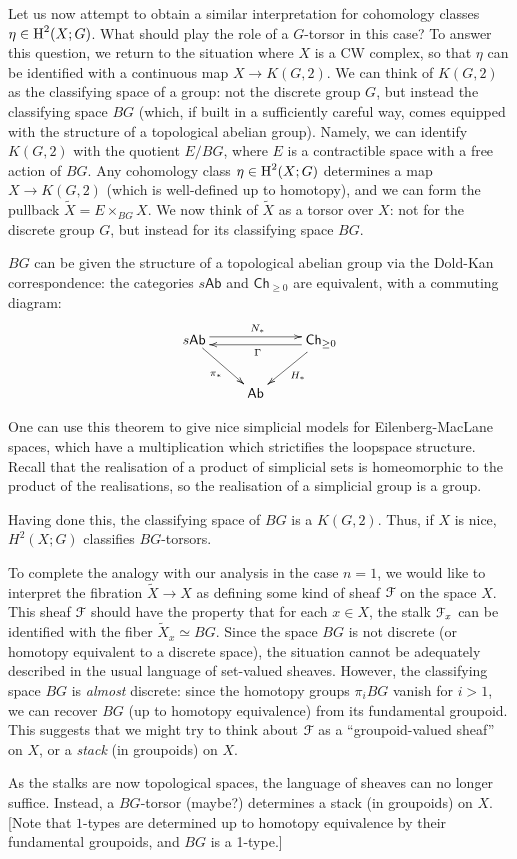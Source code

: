 Let us now attempt to obtain a similar interpretation for cohomology classes $\eta \in \operatorname{H}^{2}(X;G)$. 
What should play the role of a $G$-torsor in this case?
To answer this question, we return to the situation where $X$ is a CW complex, so that
$\eta$ can be identified with a continuous map $X \rightarrow K(G,2)$. 
We can think of
$K(G,2)$ as the classifying space of a group: not the discrete group $G$, but instead the classifying space $BG$ (which, if built in a sufficiently careful way, comes equipped with the structure of a topological abelian group). Namely, we can identify $K(G,2)$ with the quotient
$E/BG$, where $E$ is a contractible space with a free action of $BG$.
Any cohomology class $\eta \in \operatorname{H}^{2}(X;G)$ determines a map $X \rightarrow K(G,2)$
(which is well-defined up to homotopy), and we can form the pullback $\widetilde{X} = E \times_{BG} X$. We now think of $\widetilde{X}$ as a torsor over $X$: not for the discrete group $G$, but instead for its classifying space $BG$.
\begin{shaded}
$BG$ can be given the structure of a topological abelian group via the Dold-Kan correspondence:
the categories $s\mathsf{Ab}$ and $\mathsf{Ch}_{\geq0}$ are equivalent, with a commuting diagram:
\[\xymatrix{
\ar[rd]_{\pi_*}s\mathsf{Ab}\ar@<.1cm>[rr]^{N_*}&&
\mathsf{Ch}_{\geq0}\ar@<1mm>[ll]^\Gamma\ar[ld]^{H_*}\\
&\mathsf{Ab}
}\]

\noindent One can use this theorem to give nice simplicial models for Eilenberg-MacLane spaces, which have a multiplication which strictifies the loopspace structure. Recall that the realisation of a product of simplicial sets is homeomorphic to the product of the realisations, so the realisation of a simplicial group is a group.

Having done this, the classifying space of $BG$ is a $K(G,2)$. Thus, if $X$ is nice, $H^2(X;G)$  classifies $BG$-torsors.
\end{shaded}

To complete the analogy with our analysis in the case $n=1$, we would like to interpret
the fibration $\widetilde{X} \rightarrow X$ as defining some kind of sheaf $\operatorname{\mathcal{F}}$ on the space $X$.
This sheaf $\operatorname{\mathcal{F}}$ should have the property that for each $x \in X$, the stalk
$\operatorname{\mathcal{F}}_x$ can be identified with the fiber $\widetilde{X}_x \simeq BG$. Since the space $BG$ is not discrete (or homotopy equivalent to a discrete space), the situation cannot be adequately described in the usual language of set-valued sheaves. However, the classifying space $BG$ is 
{\em almost} discrete: since the homotopy groups $\pi_i BG$ vanish for $i > 1$, we
can recover $BG$ (up to homotopy equivalence) from its fundamental groupoid.
This suggests that we might try to think about $\operatorname{\mathcal{F}}$ as a ``groupoid-valued sheaf'' on $X$,
or a {\it stack} (in groupoids) on $X$.
\begin{shaded}
As the stalks are now topological spaces, the language of sheaves can no longer suffice. Instead, a $BG$-torsor (maybe?) determines a stack (in groupoids) on $X$. [Note that $1$-types are determined up to homotopy equivalence by their fundamental groupoids, and $BG$ is a 1-type.]
\end{shaded}

